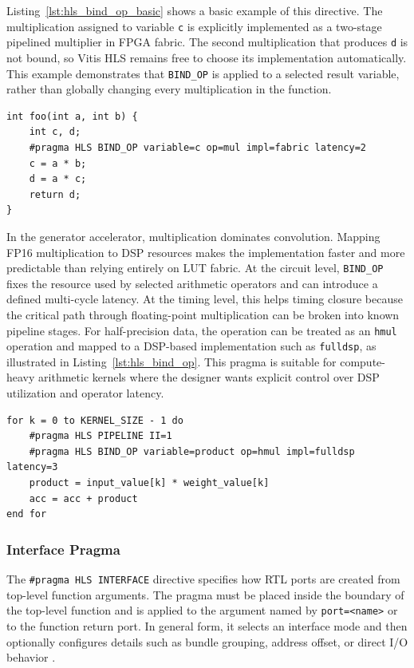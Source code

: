 Listing~\ref{lst:hls_bind_op_basic} shows a basic example of this directive. The multiplication assigned to variable \texttt{c} is explicitly implemented as a two-stage pipelined multiplier in FPGA fabric. The second multiplication that produces \texttt{d} is not bound, so Vitis HLS remains free to choose its implementation automatically. This example demonstrates that \texttt{BIND\_OP} is applied to a selected result variable, rather than globally changing every multiplication in the function.

\begin{lstlisting}[caption={Pseudo-code for binding one multiplication to fabric logic},label={lst:hls_bind_op_basic}]
int foo(int a, int b) {
    int c, d;
    #pragma HLS BIND_OP variable=c op=mul impl=fabric latency=2
    c = a * b;
    d = a * c;
    return d;
}
\end{lstlisting}

In the generator accelerator, multiplication dominates convolution. Mapping FP16 multiplication to DSP resources makes the implementation faster and more predictable than relying entirely on LUT fabric. At the circuit level, \texttt{BIND\_OP} fixes the resource used by selected arithmetic operators and can introduce a defined multi-cycle latency. At the timing level, this helps timing closure because the critical path through floating-point multiplication can be broken into known pipeline stages. For half-precision data, the operation can be treated as an \texttt{hmul} operation and mapped to a DSP-based implementation such as \texttt{fulldsp}, as illustrated in Listing~\ref{lst:hls_bind_op}. This pragma is suitable for compute-heavy arithmetic kernels where the designer wants explicit control over DSP utilization and operator latency.

\begin{lstlisting}[caption={Pseudo-code for binding FP16 multiplication to DSP resources},label={lst:hls_bind_op}]
for k = 0 to KERNEL_SIZE - 1 do
    #pragma HLS PIPELINE II=1
    #pragma HLS BIND_OP variable=product op=hmul impl=fulldsp latency=3
    product = input_value[k] * weight_value[k]
    acc = acc + product
end for
\end{lstlisting}

\subsubsection{Interface Pragma}

The \texttt{\#pragma HLS INTERFACE} directive specifies how RTL ports are created from top-level function arguments. The pragma must be placed inside the boundary of the top-level function and is applied to the argument named by \texttt{port=<name>} or to the function return port. In general form, it selects an interface mode and then optionally configures details such as bundle grouping, address offset, or direct I/O behavior \cite{amd2026vitisHls}.

